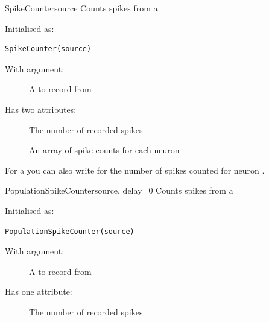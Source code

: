 \documentclass[letterpaper,10pt,english]{manual}
\begin{document}
\hypertarget{brian.SpikeCounter}{}\begin{classdesc}{SpikeCounter}{source}
Counts spikes from a \hyperlink{brian.NeuronGroup}{}

Initialised as:

\begin{Verbatim}[commandchars=@\[\]]
SpikeCounter(source)
\end{Verbatim}

With argument:
\begin{description}
\item[]
A \hyperlink{brian.NeuronGroup}{} to record from

\end{description}

Has two attributes:
\begin{description}
\item[]
The number of recorded spikes

\item[]
An array of spike counts for each neuron

\end{description}

For a \hyperlink{brian.SpikeCounter}{}  you can also write  for the
number of spikes counted for neuron .
\end{classdesc}

\hypertarget{brian.PopulationSpikeCounter}{}\begin{classdesc}{PopulationSpikeCounter}{source, delay=0}
Counts spikes from a \hyperlink{brian.NeuronGroup}{}

Initialised as:

\begin{Verbatim}[commandchars=@\[\]]
PopulationSpikeCounter(source)
\end{Verbatim}

With argument:
\begin{description}
\item[]
A \hyperlink{brian.NeuronGroup}{} to record from

\end{description}

Has one attribute:
\begin{description}
\item[]
The number of recorded spikes

\end{description}
\end{classdesc}
\end{document}
